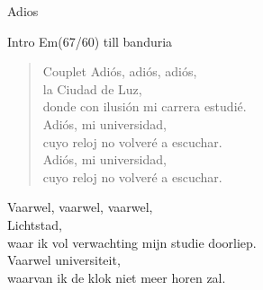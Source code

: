 \begin{song}[tango]{Adios}

\begin{instrumental}{Intro}
Em(67/60) till banduria
 \measure{} \measure{} \measure{}  \measure{}    \measure{}  \measure{}  \measure{}  \measure*{}
\end{instrumental}


\begin{verse}{Couplet}
Adiós, adiós, adiós,\\
\chord{}la Ciudad de Luz,\\
donde con ilusión mi carrera estudié.\\
Adiós, mi universidad,\\
cuyo reloj no volveré a escuchar.\\
Adiós, mi universidad,\\
cuyo reloj no volveré a escuchar.\\
\end{verse}
\repetition{[Fonseca]}
\end{song}
\begin{translation}
Vaarwel, vaarwel, vaarwel,\\
Lichtstad,\\
waar ik vol verwachting mijn studie doorliep.\\
Vaarwel universiteit,\\
waarvan ik de klok niet meer horen zal.\\
\end{translation}

\clearpage
